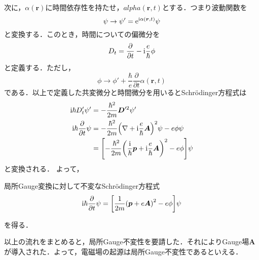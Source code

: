 \documentclass{report}
\begin{document}
  次に，$\alpha(\bm{r})$に時間依存性を持たせ，$alpha(\bm{r},t)$とする．つまり波動関数を
  \begin{equation}
    \psi\to\psi'=\mathrm{e}^{\mathrm{i}\alpha(\bm{r},t)}\psi
  \end{equation}
  と変換する．このとき，時間についての偏微分を
  \begin{equation}
    D_t=\frac{\partial}{\partial t} - \mathrm{i}\frac{e}{\hbar}\phi
  \end{equation}
  と定義する．ただし，
  \begin{equation}
    \phi \to \phi' + \frac{\hbar}{e}\frac{\partial}{\partial t}\alpha(\bm{r},t)
  \end{equation}
  である．以上で定義した共変微分と時間微分を用いるとSchrödinger方程式は
  \begin{align}
    \mathrm{i}\hbar D'_t\psi' &= -\frac{\hbar^2}{2m}\bm{D}'^2\psi'\\
    \mathrm{i}\hbar\frac{\partial}{\partial t}\psi&= -\frac{\hbar^2}{2m}\qty(\nabla + \mathrm{i}\frac{e}{\hbar}\bm{A})^2\psi - e\phi\psi\\
    &= \qty[-\frac{\hbar^2}{2m}\qty(\frac{\mathrm{i}}{\hbar}\bm{p} + \mathrm{i}\frac{e}{\hbar}\bm{A})^2 - e\phi]\psi
  \end{align}
  と変換される．
  よって，
  \begin{itembox}[l]{局所Gauge変換に対して不変なSchrödinger方程式}
    \begin{equation}
      \mathrm{i}\hbar\frac{\partial}{\partial t}\psi=\qty[\frac{1}{2m}\qty(\bm{p} + e\bm{A})^2 - e\phi]\psi
    \end{equation}
  \end{itembox}
  を得る．

  以上の流れをまとめると，局所Gauge不変性を要請した．それによりGauge場$\bm{A}$が導入された．よって，電磁場の起源は局所Gauge不変性であるといえる．
\end{document}
